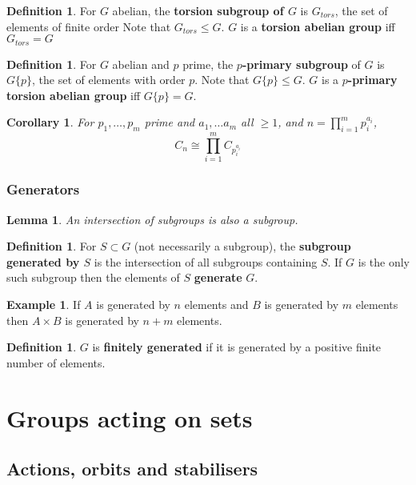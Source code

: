 \documentclass[12pt]{article}
\newtheorem{lem}[thm]{Lemma}
\newtheorem{cor}[thm]{Corollary}
\theoremstyle{definition}
\newtheorem{defn}[thm]{Definition}
\newtheorem{exm}[thm]{Example}
\begin{document}
\begin{defn}
  For $G$ abelian, the \textbf{torsion subgroup of $G$} is $G_{tors}$, the set of elements of finite order
  Note that $G_{tors} \leq G$.
  $G$ is a \textbf{torsion abelian group} iff $G_{tors} = G$
\end{defn}

\begin{defn}
  For $G$ abelian and $p$ prime, the \textbf{$p$-primary subgroup} of $G$ is $G\{p\}$, the set of elements with order $p$.
  Note that $G\{p\} \leq G$.
  $G$ is a \textbf{$p$-primary torsion abelian group} iff $G\{p\} = G$.
\end{defn}

\begin{cor}
  For $p_1, \ldots, p_m$ prime and $a_1, \ldots a_m$ all $\geq 1$, and $n = \prod_{i = 1}^mp_i^{a_i}$,
  $$C_n \cong \prod_{i = 1}^mC_{p_i^{a_i}}$$
\end{cor}

\subsubsection{Generators}

\begin{lem}
  An intersection of subgroups is also a subgroup.
\end{lem}

\begin{defn}
  For $S \subset G$ (not necessarily a subgroup), the \textbf{subgroup generated by $S$} is the intersection of all subgroups containing $S$.
  If $G$ is the only such subgroup then the elements of $S$ \textbf{generate} $G$.
\end{defn}

\begin{exm}
  If $A$ is generated by $n$ elements and $B$ is generated by $m$ elements then $A \times B$ is generated by $n + m$ elements.
\end{exm}

\begin{defn}
  $G$ is \textbf{finitely generated} if it is generated by a positive finite number of elements.
\end{defn}

\section{Groups acting on sets}

\subsection{Actions, orbits and stabilisers}
\end{document}
